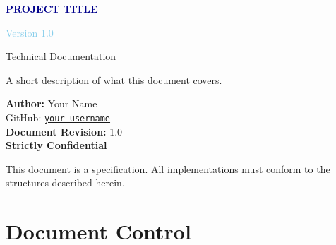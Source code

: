 \documentclass[11pt,a4paper]{article}
\begin{document}
\begin{titlepage}
    \centering
    \vspace*{2cm}
    {\Huge\bfseries\textcolor{darkblue}{PROJECT TITLE}\par}
    \vspace{0.5cm}
    {\LARGE\textcolor{skyblue}{Version 1.0}\par}
    \vspace{0.3cm}
    {\large\textcolor{codegray}{Technical Documentation}\par}
    \vspace{2cm}
    {\large A short description of what this document covers.\par}
    \vspace{3cm}

    {\normalsize
        \textbf{Author:} Your Name\\
        GitHub: \href{https://github.com/your-username}{\texttt{your-username}}\\[1em]
        \textbf{Document Revision:} 1.0\\
        \vspace{0.8cm}
        \LARGE\textcolor{alertred}{\textbf{Strictly Confidential}}
    }

    \vfill
    {\footnotesize\textcolor{codegray}{This document is a specification. All implementations must conform to the structures described herein.}}
\end{titlepage}

\newpage
\section*{Document Control}
\end{document}
